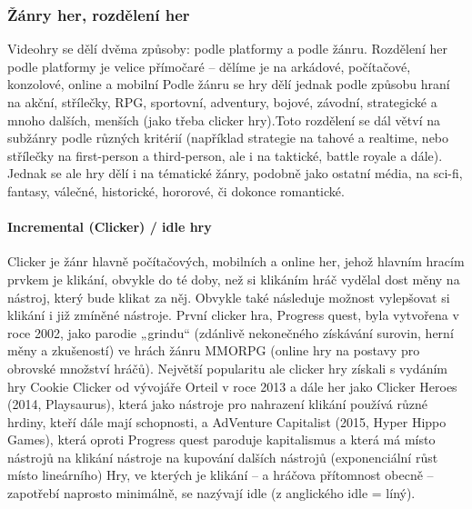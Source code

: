 \documentclass{article}
\begin{document}
\subsubsection{Žánry her, rozdělení her}
Videohry se dělí dvěma způsoby: podle platformy a podle žánru.
Rozdělení her podle platformy je velice přímočaré – dělíme je na arkádové, počítačové, konzolové, online a mobilní
Podle žánru se hry dělí jednak podle způsobu hraní na akční, střílečky, RPG, sportovní, adventury, bojové, závodní, strategické a mnoho dalších, menších (jako třeba clicker hry).Toto rozdělení se dál větví na subžánry podle různých kritérií (například strategie na tahové a realtime, nebo střílečky na first-person a third-person, ale i na taktické, battle royale a dále). Jednak se ale hry dělí i na tématické žánry, podobně jako ostatní média, na sci-fi, fantasy, válečné, historické, hororové, či dokonce romantické.
\paragraph{Incremental (Clicker) / idle hry}
Clicker je žánr hlavně počítačových, mobilních a online her, jehož hlavním hracím prvkem je klikání, obvykle do té doby, než si klikáním hráč vydělal dost měny na nástroj, který bude klikat za něj. Obvykle také následuje možnost vylepšovat si klikání i již zmíněné nástroje.
První clicker hra, Progress quest, byla vytvořena v roce 2002, jako parodie „grindu“ (zdánlivě nekonečného získávání surovin, herní měny a zkušeností) ve hrách žánru MMORPG (online hry na postavy pro obrovské množství hráčů). Největší popularitu ale clicker hry získali s vydáním hry Cookie Clicker od vývojáře Orteil v roce 2013 a dále her jako Clicker Heroes (2014, Playsaurus), která jako nástroje pro nahrazení klikání používá různé hrdiny, kteří dále mají schopnosti, a AdVenture Capitalist (2015, Hyper Hippo Games), která oproti Progress quest paroduje kapitalismus a která má místo nástrojů na klikání nástroje na kupování dalších nástrojů (exponenciální růst místo lineárního)
Hry, ve kterých je klikání – a hráčova přítomnost obecně – zapotřebí naprosto minimálně, se nazývají idle (z anglického idle = líný). 
\end{document}
